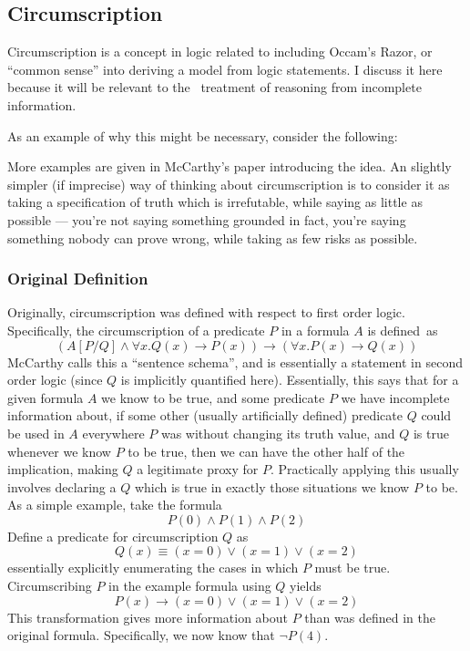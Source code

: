 
\subsection{Circumscription}
Circumscription is a concept in logic related to including Occam's Razor, or ``common sense'' into deriving a model from logic statements.
I discuss it here because it will be relevant to the \sysname\ treatment of reasoning from incomplete information.

As an example of why this might be necessary, consider the following:

More examples are given in McCarthy's paper introducing the idea.
An slightly simpler (if imprecise) way of thinking about circumscription is to consider it as taking a specification of truth which is irrefutable, while saying as little as possible --- you're not saying something grounded in fact, you're saying something nobody can prove wrong, while taking as few risks as possible.
\subsubsection{Original Definition}
Originally, circumscription was defined with respect to first order logic.
Specifically, the circumscription of a predicate $P$ in a formula $A$ is defined\ as
\[
(A [P/Q] \wedge \forall x. Q(x) \rightarrow P(x)) \rightarrow (\forall x. P(x) \rightarrow Q(x))
\]
McCarthy calls this a ``sentence schema'', and is essentially a statement in second order logic (since $Q$ is implicitly quantified here).
Essentially, this says that for a given formula $A$ we know to be true, and some predicate $P$ we have incomplete information about, if some other (usually artificially defined) predicate $Q$ could be used in $A$ everywhere $P$ was without changing its truth value, and $Q$ is true whenever we know $P$ to be true, then we can have the other half of the implication, making $Q$ a legitimate proxy for $P$.
Practically applying this usually involves declaring a $Q$ which is true in exactly those situations we know $P$ to be.
As a simple example, take the formula 
\[
        P(0) \wedge P(1) \wedge P(2)
\]
Define a predicate for circumscription $Q$ as
\[
        Q(x) \equiv (x = 0) \vee (x = 1) \vee (x = 2)
\]
essentially explicitly enumerating the cases in which $P$ must be true. 
Circumscribing $P$ in the example formula using $Q$ yields
\[
        P(x) \rightarrow (x = 0) \vee (x = 1) \vee (x = 2)
\]
This transformation gives more information about $P$ than was defined in the original formula.
Specifically, we now know that $\neg P(4)$.

